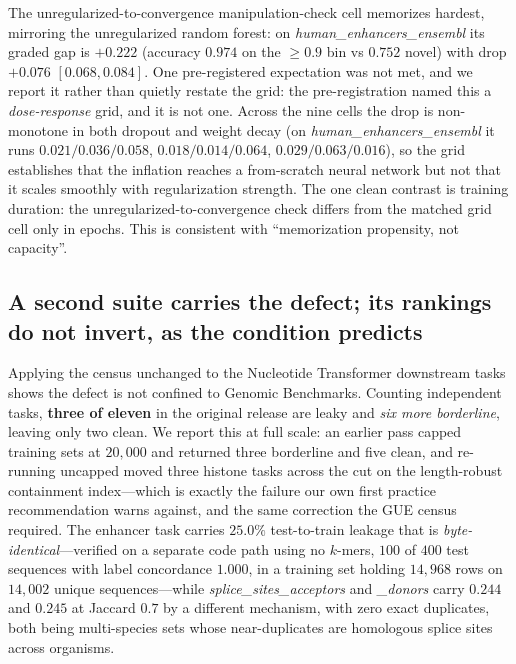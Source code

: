 \documentclass[webpdf,modern,large,namedate]{oup-authoring-template}%
\begin{document}
The unregularized-to-convergence manipulation-check cell memorizes hardest, mirroring the unregularized random forest: on \textit{human\_enhancers\_ensembl} its graded gap is $+0.222$ (accuracy $0.974$ on the $\ge0.9$ bin vs $0.752$ novel) with drop $+0.076$ $[0.068,0.084]$. One pre-registered expectation was not met, and we report it rather than quietly restate the grid: the pre-registration named this a \emph{dose-response} grid, and it is not one. Across the nine cells the drop is non-monotone in both dropout and weight decay (on \textit{human\_enhancers\_ensembl} it runs $0.021/0.036/0.058$, $0.018/0.014/0.064$, $0.029/0.063/0.016$), so the grid establishes that the inflation reaches a from-scratch neural network but not that it scales smoothly with regularization strength. The one clean contrast is training duration: the unregularized-to-convergence check differs from the matched grid cell only in epochs. This is consistent with ``memorization propensity, not capacity''.

\subsection{A second suite carries the defect; its rankings do not invert, as the condition predicts}\label{sec:r-census}
Applying the census unchanged to the Nucleotide Transformer downstream tasks shows the defect is not confined to Genomic Benchmarks. Counting independent tasks, \textbf{three of eleven} in the original release are leaky and \emph{six more borderline}, leaving only two clean. We report this at full scale: an earlier pass capped training sets at $20{,}000$ and returned three borderline and five clean, and re-running uncapped moved three histone tasks across the cut on the length-robust containment index---which is exactly the failure our own first practice recommendation warns against, and the same correction the GUE census required. The enhancer task carries $25.0\%$ test-to-train leakage that is \emph{byte-identical}---verified on a separate code path using no $k$-mers, $100$ of $400$ test sequences with label concordance $1.000$, in a training set holding $14{,}968$ rows on $14{,}002$ unique sequences---while \textit{splice\_sites\_acceptors} and \textit{\_donors} carry $0.244$ and $0.245$ at Jaccard $0.7$ by a different mechanism, with zero exact duplicates, both being multi-species sets whose near-duplicates are homologous splice sites across organisms.
\end{document}

